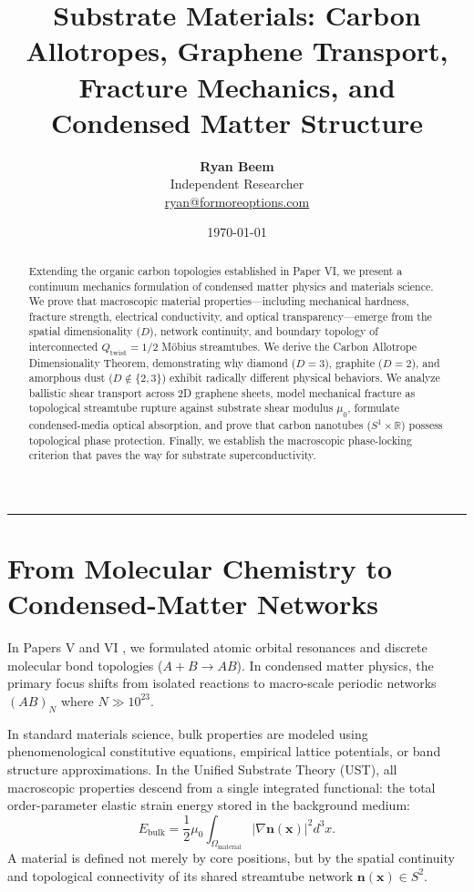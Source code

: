 \documentclass[11pt,a4paper]{article}
\title{\Large\bfseries Substrate Materials: Carbon Allotropes, Graphene Transport, Fracture Mechanics, and Condensed Matter Structure}
\author{
	\textbf{Ryan Beem}\\[0.5em]
	\small Independent Researcher \\
	\small \href{mailto:ryan@formoreoptions.com}{ryan@formoreoptions.com}
}
\date{\today}
\begin{document}
	
	\maketitle
	
	\begin{abstract}
		Extending the organic carbon topologies established in Paper VI, we present a continuum mechanics formulation of condensed matter physics and materials science. We prove that macroscopic material properties—including mechanical hardness, fracture strength, electrical conductivity, and optical transparency—emerge from the spatial dimensionality ($D$), network continuity, and boundary topology of interconnected $Q_{\text{twist}} = 1/2$ Möbius streamtubes. We derive the Carbon Allotrope Dimensionality Theorem, demonstrating why diamond ($D=3$), graphite ($D=2$), and amorphous dust ($D \notin \{2,3\}$) exhibit radically different physical behaviors. We analyze ballistic shear transport across 2D graphene sheets, model mechanical fracture as topological streamtube rupture against substrate shear modulus $\mu_0$, formulate condensed-media optical absorption, and prove that carbon nanotubes ($S^1 \times \mathbb{R}$) possess topological phase protection. Finally, we establish the macroscopic phase-locking criterion that paves the way for substrate superconductivity.
	\end{abstract}
	
	\vspace{1em}
	\hrule
	\vspace{1.5em}
	
	\section{From Molecular Chemistry to Condensed-Matter Networks}
	\label{sec:intro_lattices}
	
	In Papers V and VI \cite{PaperV, PaperVI}, we formulated atomic orbital resonances and discrete molecular bond topologies ($A + B \to AB$). In condensed matter physics, the primary focus shifts from isolated reactions to macro-scale periodic networks $(AB)_N$ where $N \gg 10^{23}$.
	
	In standard materials science, bulk properties are modeled using phenomenological constitutive equations, empirical lattice potentials, or band structure approximations. In the Unified Substrate Theory (UST), all macroscopic properties descend from a single integrated functional: the total order-parameter elastic strain energy stored in the background medium:
	\begin{equation}
		E_{\text{bulk}} = \frac{1}{2}\mu_0 \int_{\Omega_{\text{material}}} \left| \nabla \mathbf{n}(\mathbf{x}) \right|^2 d^3x.
		\label{eq:bulk_strain_functional}
	\end{equation}
	A material is defined not merely by core positions, but by the spatial continuity and topological connectivity of its shared streamtube network $\mathbf{n}(\mathbf{x}) \in S^2$.
	
\end{document}
